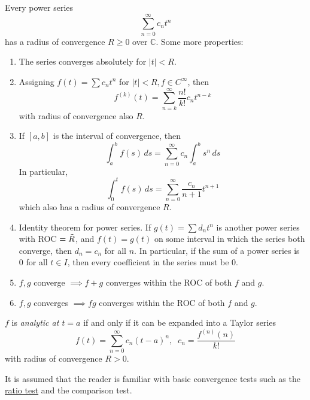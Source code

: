 \documentclass{article}
\newcounter{theorem}[section]
\newcounter{definition}[section]
\begin{document}
    Every power series 
    \begin{equation}
      \sum_{n=0}^\infty c_n t^n
    \end{equation}
    has a radius of convergence $R \geq 0$ over $\mathbb{C}$. Some more properties: 
    \begin{enumerate}
        \item The series converges absolutely for $|t| < R$. 
        \item Assigning $f(t) = \sum c_n t^n$ for $|t| < R, f \in C^\infty$, then 
        \begin{equation}
          f^{(k)}(t) = \sum_{n=k}^\infty \frac{n!}{k!} c_n t^{n-k}
        \end{equation}
        with radius of convergence also $R$.
        \item If $[a, b]$ is the interval of convergence, then 
        \begin{equation}
          \int_a^b f(s) \,ds = \sum_{n=0}^\infty c_n \int_a^b s^n \, ds
        \end{equation}
        In particular, 
        \begin{equation}
          \int_0^t f(s)\,ds = \sum_{n=0}^\infty \frac{c_n}{n+1} t^{n+1}
        \end{equation}
        which also has a radius of convergence $R$. 
        \item Identity theorem for power series. If $g(t) = \sum d_n t^n$ is another power series with ROC $= \Tilde{R}$, and $f(t) = g(t)$ on some interval in which the series both converge, then $d_n = c_n$ for all $n$. In particular, if the sum of a power series is $0$ for all $t \in I$, then every coefficient in the series must be $0$. 
        \item $f, g$ converge $\implies f+g$ converges within the ROC of both $f$ and $g$. 
        \item $f, g$ converges $\implies fg$ converges within the ROC of both $f$ and $g$. 
    \end{enumerate}

    \begin{definition}[Analytic at $t = a$]
      \label{def:analytic-at-ta}
    $f$ is \textit{analytic at $t=a$} if and only if it can be expanded into a Taylor series 
    \begin{equation}
      f(t) = \sum_{n=0}^\infty c_n (t-a)^n, \;\; c_n = \frac{f^{(n)}(n)}{k!}
    \end{equation}
    with radius of convergence $R > 0$. 
    \end{definition}
    It is assumed that the reader is familiar with basic convergence tests such as the \hyperref[real-thm:ratio-test]{ratio test} and the comparison test. 
\end{document}
